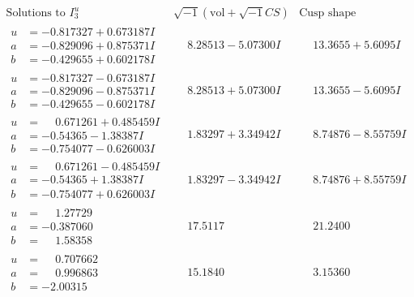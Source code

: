 \documentclass[1p]{elsarticle_modified}
\theoremstyle{definition}
\newcommand{\I}{\sqrt{-1}}
\begin{document}
$$\begin{array}{c|c|c}  
\text{Solutions to }I^u_{3}& \I (\text{vol} + \sqrt{-1}CS) & \text{Cusp shape}\\
 \hline 
\begin{aligned}
u &= -0.817327 + 0.673187 I \\
a &= -0.829096 + 0.875371 I \\
b &= -0.429655 + 0.602178 I\end{aligned}
 & \phantom{-}8.28513 - 5.07300 I & \phantom{-}13.3655 + 5.6095 I \\ \hline\begin{aligned}
u &= -0.817327 - 0.673187 I \\
a &= -0.829096 - 0.875371 I \\
b &= -0.429655 - 0.602178 I\end{aligned}
 & \phantom{-}8.28513 + 5.07300 I & \phantom{-}13.3655 - 5.6095 I \\ \hline\begin{aligned}
u &= \phantom{-}0.671261 + 0.485459 I \\
a &= -0.54365 - 1.38387 I \\
b &= -0.754077 - 0.626003 I\end{aligned}
 & \phantom{-}1.83297 + 3.34942 I & \phantom{-}8.74876 - 8.55759 I \\ \hline\begin{aligned}
u &= \phantom{-}0.671261 - 0.485459 I \\
a &= -0.54365 + 1.38387 I \\
b &= -0.754077 + 0.626003 I\end{aligned}
 & \phantom{-}1.83297 - 3.34942 I & \phantom{-}8.74876 + 8.55759 I \\ \hline\begin{aligned}
u &= \phantom{-}1.27729\phantom{ +0.000000I} \\
a &= -0.387060\phantom{ +0.000000I} \\
b &= \phantom{-}1.58358\phantom{ +0.000000I}\end{aligned}
 & \phantom{-}17.5117\phantom{ +0.000000I} & \phantom{-}21.2400\phantom{ +0.000000I} \\ \hline\begin{aligned}
u &= \phantom{-}0.707662\phantom{ +0.000000I} \\
a &= \phantom{-}0.996863\phantom{ +0.000000I} \\
b &= -2.00315\phantom{ +0.000000I}\end{aligned}
 & \phantom{-}15.1840\phantom{ +0.000000I} & \phantom{-}3.15360\phantom{ +0.000000I} \\ \hline\begin{aligned}

\end{aligned}
\end{array}$$
\end{document}
